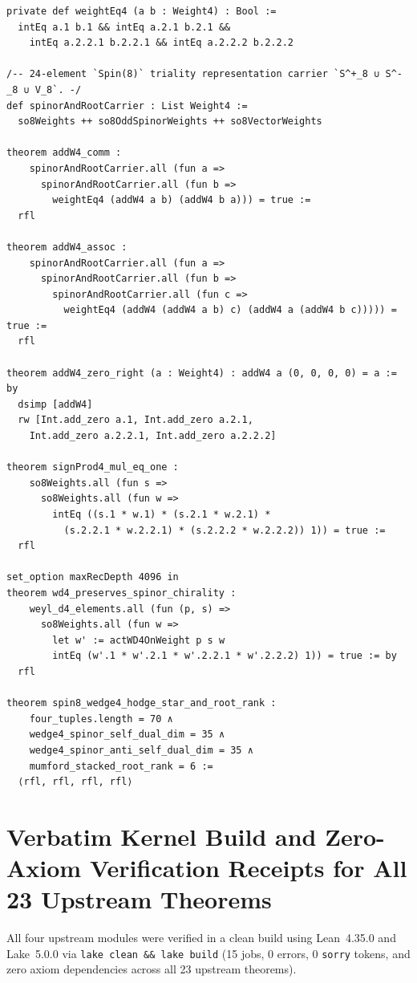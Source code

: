 \documentclass[11pt,a4paper]{article}
\begin{document}
\begin{lstlisting}[caption={Constructive \texttt{Weight4} lattice laws and $W(D_4)$ chirality preservation in \texttt{MathlibPR\_Spin8Triality.lean}.}]
private def weightEq4 (a b : Weight4) : Bool :=
  intEq a.1 b.1 && intEq a.2.1 b.2.1 &&
    intEq a.2.2.1 b.2.2.1 && intEq a.2.2.2 b.2.2.2

/-- 24-element `Spin(8)` triality representation carrier `S^+_8 ∪ S^-_8 ∪ V_8`. -/
def spinorAndRootCarrier : List Weight4 :=
  so8Weights ++ so8OddSpinorWeights ++ so8VectorWeights

theorem addW4_comm :
    spinorAndRootCarrier.all (fun a =>
      spinorAndRootCarrier.all (fun b =>
        weightEq4 (addW4 a b) (addW4 b a))) = true :=
  rfl

theorem addW4_assoc :
    spinorAndRootCarrier.all (fun a =>
      spinorAndRootCarrier.all (fun b =>
        spinorAndRootCarrier.all (fun c =>
          weightEq4 (addW4 (addW4 a b) c) (addW4 a (addW4 b c))))) = true :=
  rfl

theorem addW4_zero_right (a : Weight4) : addW4 a (0, 0, 0, 0) = a := by
  dsimp [addW4]
  rw [Int.add_zero a.1, Int.add_zero a.2.1,
    Int.add_zero a.2.2.1, Int.add_zero a.2.2.2]

theorem signProd4_mul_eq_one :
    so8Weights.all (fun s =>
      so8Weights.all (fun w =>
        intEq ((s.1 * w.1) * (s.2.1 * w.2.1) *
          (s.2.2.1 * w.2.2.1) * (s.2.2.2 * w.2.2.2)) 1)) = true :=
  rfl

set_option maxRecDepth 4096 in
theorem wd4_preserves_spinor_chirality :
    weyl_d4_elements.all (fun (p, s) =>
      so8Weights.all (fun w =>
        let w' := actWD4OnWeight p s w
        intEq (w'.1 * w'.2.1 * w'.2.2.1 * w'.2.2.2) 1)) = true := by
  rfl

theorem spin8_wedge4_hodge_star_and_root_rank :
    four_tuples.length = 70 ∧
    wedge4_spinor_self_dual_dim = 35 ∧
    wedge4_spinor_anti_self_dual_dim = 35 ∧
    mumford_stacked_root_rank = 6 :=
  ⟨rfl, rfl, rfl, rfl⟩
\end{lstlisting}

\appendix
\section{Verbatim Kernel Build and Zero-Axiom Verification Receipts for All 23 Upstream Theorems}

All four upstream modules were verified in a clean build using Lean~4.35.0 and Lake~5.0.0 via \texttt{lake clean \&\& lake build} (15 jobs, 0 errors, 0 \texttt{sorry} tokens, and zero axiom dependencies across all 23 upstream theorems).
\end{document}
